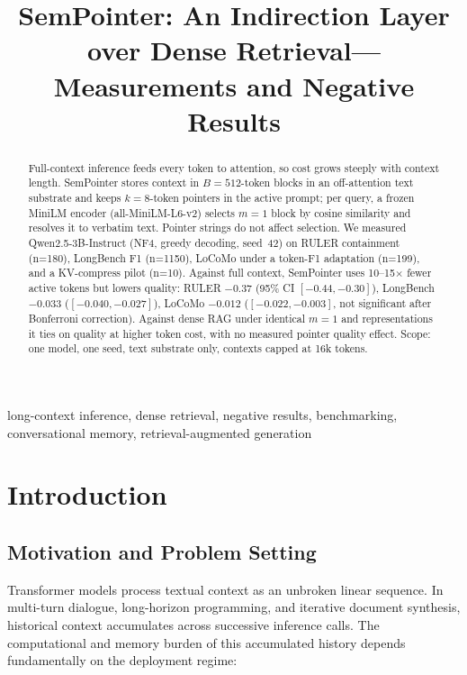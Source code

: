 \documentclass[conference]{IEEEtran}
\begin{document}

\title{SemPointer: An Indirection Layer over Dense Retrieval---Measurements and Negative Results}

\author{
}

\maketitle

\begin{abstract}
Full-context inference feeds every token to attention, so cost grows steeply with context length. SemPointer stores context in $B{=}512$-token blocks in an off-attention text substrate and keeps $k{=}8$-token pointers in the active prompt; per query, a frozen MiniLM encoder (all-MiniLM-L6-v2) selects $m{=}1$ block by cosine similarity and resolves it to verbatim text. Pointer strings do not affect selection. We measured Qwen2.5-3B-Instruct (NF4, greedy decoding, seed~42) on RULER containment (n=180), LongBench F1 (n=1150), LoCoMo under a token-F1 adaptation (n=199), and a KV-compress pilot (n=10). Against full context, SemPointer uses 10--15$\times$ fewer active tokens but lowers quality: RULER $-0.37$ (95\% CI $[-0.44,-0.30]$), LongBench $-0.033$ ($[-0.040,-0.027]$), LoCoMo $-0.012$ ($[-0.022,-0.003]$, not significant after Bonferroni correction). Against dense RAG under identical $m{=}1$ and representations it ties on quality at higher token cost, with no measured pointer quality effect. Scope: one model, one seed, text substrate only, contexts capped at 16k tokens.
\end{abstract}

\begin{IEEEkeywords}
long-context inference, dense retrieval, negative results, benchmarking, conversational memory, retrieval-augmented generation
\end{IEEEkeywords}

\section{Introduction}

\subsection{Motivation and Problem Setting}\label{sec:motivation}
Transformer models \cite{vaswani2017attention} process textual context as an unbroken linear sequence. In multi-turn dialogue, long-horizon programming, and iterative document synthesis, historical context accumulates across successive inference calls. The computational and memory burden of this accumulated history depends fundamentally on the deployment regime:
\end{document}
